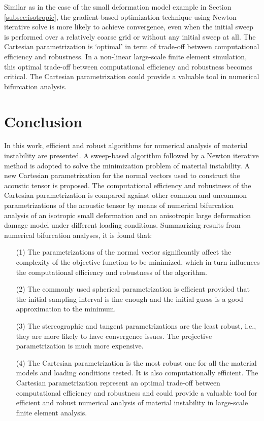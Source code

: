 \documentclass[12pt]{article}
\numberwithin{equation}{section}
\begin{document}
Similar as in the case of the small deformation model example in 
Section \ref{subsec:isotropic}, the gradient-based optimization 
technique using Newton iterative solve is more likely to achieve 
convergence, even when the initial sweep is performed over a 
relatively coarse grid or without any initial sweep at all. The 
Cartesian parametrization is `optimal' in term of trade-off between 
computational efficiency and robustness. In a non-linear large-scale 
finite element simulation, this optimal trade-off between 
computational efficiency and robustness becomes critical. The 
Cartesian parametrization could provide a valuable tool in numerical 
bifurcation analysis. 

\section{Conclusion}

In this work, efficient and robust algorithms for numerical analysis 
of material instability are presented. A sweep-based algorithm 
followed by a Newton iterative method is adopted to solve the 
minimization problem of material instability. A new Cartesian 
parametrization for the normal vectors used to construct the acoustic 
tensor is proposed. The computational efficiency and robustness of the 
Cartesian parametrization is compared against other common and 
uncommon parametrizations of the acoustic tensor by means of numerical 
bifurcation analysis of an isotropic small deformation and an 
anisotropic large deformation damage model under different loading 
conditions. Summarizing results from numerical bifurcation analyses, 
it is found that:

\begin{enumerate}
\item[(1)] 
The parametrizations of the normal vector significantly affect the 
complexity of the objective function to be minimized, which in turn 
influences the computational efficiency and robustness of the 
algorithm. 

\item[(2)] 
The commonly used spherical parametrization is efficient provided 
that the initial sampling interval is fine enough and the initial 
guess is a good approximation to the minimum. 

\item[(3)] 
The stereographic and tangent parametrizations are the least 
robust, i.e., they are more likely to have convergence issues. The 
projective parametrization is much more expensive. 

\item[(4)] 
The Cartesian parametrization is the most robust one for all the 
material models and loading conditions tested. It is also 
computationally efficient. The Cartesian parametrization represent an 
optimal trade-off between computational efficiency and robustness and 
could provide a valuable tool for efficient and robust numerical 
analysis of material instability in large-scale finite element 
analysis. 
\end{enumerate}

%


\end{document}
